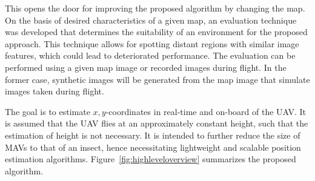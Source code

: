 This opens the door for improving the proposed
algorithm by changing the map. On the basis of desired characteristics
of a given map, an evaluation technique was developed that determines
the suitability of an environment for the proposed approach. This
technique allows for spotting distant regions with similar image
features, which could lead to deteriorated performance. The evaluation
can be performed using a given map image or recorded images during
flight. In the former case, synthetic images will be generated from
the map image that simulate images taken during flight.

The goal is to estimate $x,y$-coordinates in real-time and on-board of the UAV. It is assumed that the UAV flies at an approximately constant height, such that the estimation of height is not necessary.  It is intended to further reduce the size of MAVs to that of an
insect, hence necessitating lightweight and scalable position
estimation algorithms. Figure~\ref{fig:highleveloverview} summarizes the proposed algorithm.